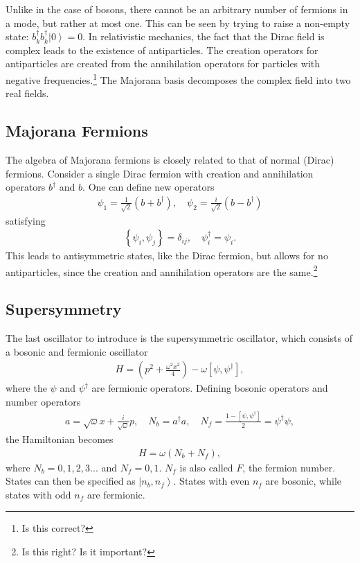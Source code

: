 \documentclass[12pt]{article} %
\renewcommand{\th}[1]{\frac{1}{#1}}
\newcommand{\om}{\omega}
\newcommand{\ket}[1]{\left|#1\right\rangle}
\newcommand{\comm}[2]{\left[#1,#2\right]}
\newcommand{\acom}[2]{\left\{#1,#2\right\}}
\begin{document}
Unlike in the case of bosons, there cannot be an arbitrary number of fermions in a mode, but rather at most one. This can be seen by trying to raise a non-empty state: $b_k^\dag b^\dag_k\ket{0} = 0$. In relativistic mechanics, the fact that the Dirac field is complex leads to the existence of antiparticles. The creation operators for antiparticles are created from the annihilation operators for particles with negative frequencies.\footnote{Is this correct?} The Majorana basis decomposes the complex field into two real fields.

\subsection{Majorana Fermions} \emph{} \label{sub:majorana}

The algebra of Majorana fermions is closely related to that of normal (Dirac) fermions. Consider a single Dirac fermion with creation and annihilation operators $b^\dag$ and $b$. One can define new operators
\begin{align}
\psi_1 = \th{\sqrt{2}}(b+b^\dag ),\quad \psi_2 = \frac{i}{\sqrt{2}}(b-b^\dag)
\end{align}
satisfying
\begin{align}
\acom{\psi_i}{\psi_j} = \delta_{ij},\quad \psi_i^\dag=\psi_i.
\end{align}
This leads to antisymmetric states, like the Dirac fermion, but allows for no antiparticles, since the creation and annihilation operators are the same.\footnote{Is this right? Is it important?} 

\subsection{Supersymmetry} \emph{} \label{sub:susy}

The last oscillator to introduce is the supersymmetric oscillator, which consists of a bosonic and fermionic oscillator
\begin{align}
H = \left(p^2+\frac{\om^2 x^2}{4}\right) - \om\left[\psi, \psi^\dag\right],
\end{align}
where the $\psi$ and $\psi^\dag$ are fermionic operators. Defining bosonic operators and number operators
\begin{align}
a = \sqrt{\om}x+\frac{i}{\sqrt{\om}}p,\quad N_b = a^\dag a,\quad N_f = \frac{1-\comm{\psi}{ \psi^\dag}}{2} = \psi^\dag \psi,
\end{align}
the Hamiltonian becomes
\begin{align}
H = \om \left(N_b + N_f\right),
\end{align}
where $N_b = 0,1,2,3...$ and $N_f = 0,1$. $N_f$ is also called $F$, the fermion number. States can then be specified as $\ket{n_b,n_f}$. States with even $n_f$ are bosonic, while states with odd $n_f$ are fermionic.
 
\end{document}
